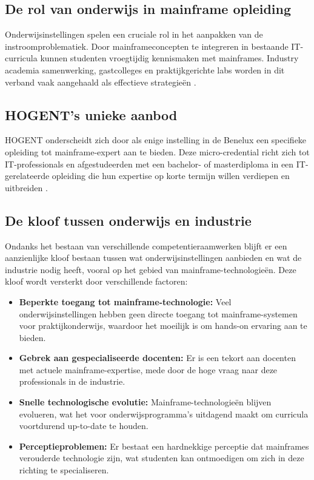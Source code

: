 \subsection{De rol van onderwijs in mainframe opleiding}
\label{sec:mainframe-opleidingen}

Onderwijsinstellingen spelen een cruciale rol in het aanpakken van de instroomproblematiek. Door mainframeconcepten te integreren in bestaande IT-curricula kunnen studenten vroegtijdig kennismaken met mainframes. Industry academia samenwerking, gastcolleges en praktijkgerichte labs worden in dit verband vaak aangehaald als effectieve strategieën \autocite{kyndrylskillsgap}.

\subsection{HOGENT’s unieke aanbod}

HOGENT onderscheidt zich door als enige instelling in de Benelux een specifieke opleiding tot mainframe-expert aan te bieden. Deze micro-credential richt zich tot IT-professionals en afgestudeerden met een bachelor- of masterdiploma in een IT-gerelateerde opleiding die hun expertise op korte termijn willen verdiepen en uitbreiden \autocite{hogent2025}.


\subsection{De kloof tussen onderwijs en industrie}

Ondanks het bestaan van verschillende competentieraamwerken blijft er een aanzienlijke kloof bestaan tussen wat onderwijsinstellingen aanbieden en wat de industrie nodig heeft, vooral op het gebied van mainframe-technologieën. Deze kloof wordt versterkt door verschillende factoren:

\begin{itemize}
	\item \textbf{Beperkte toegang tot mainframe-technologie:} Veel onderwijsinstellingen hebben geen directe toegang tot mainframe-systemen voor praktijkonderwijs, waardoor het moeilijk is om hands-on ervaring aan te bieden.
	
	\item \textbf{Gebrek aan gespecialiseerde docenten:} Er is een tekort aan docenten met actuele mainframe-expertise, mede door de hoge vraag naar deze professionals in de industrie.
	
	\item \textbf{Snelle technologische evolutie:} Mainframe-technologieën blijven evolueren, wat het voor onderwijsprogramma’s uitdagend maakt om curricula voortdurend up-to-date te houden.
	
	\item \textbf{Perceptieproblemen:} Er bestaat een hardnekkige perceptie dat mainframes verouderde technologie zijn, wat studenten kan ontmoedigen om zich in deze richting te specialiseren.
\end{itemize}


